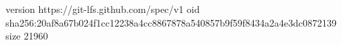 version https://git-lfs.github.com/spec/v1
oid sha256:20af8a67b024f1cc12238a4cc8867878a540857b9f59f8434a2a4e3dc0872139
size 21960
